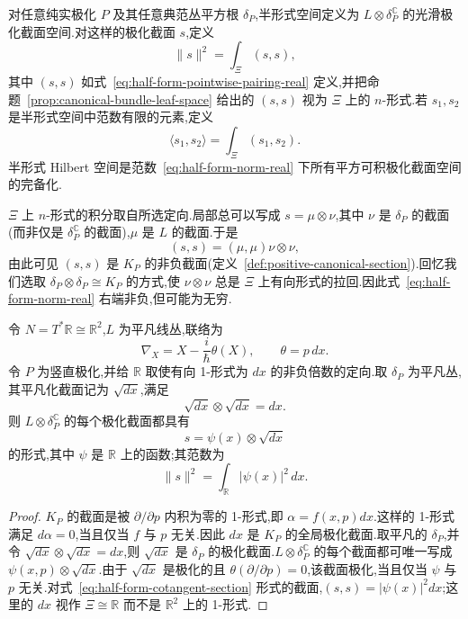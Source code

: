 \begin{definition}
\label{def:half-form-space-real}
对任意纯实极化 $P$ 及其任意典范丛平方根 $\delta_P$,半形式空间定义为 $L\otimes\delta_P^{\mathbb C}$ 的光滑极化截面空间.对这样的极化截面 $s$,定义
\[
 \|s\|^2=\int_\Xi(s,s),
 \label{eq:half-form-norm-real}
\]
其中 $(s,s)$ 如式~\eqref{eq:half-form-pointwise-pairing-real} 定义,并把命题~\ref{prop:canonical-bundle-leaf-space} 给出的 $(s,s)$ 视为 $\Xi$ 上的 $n$-形式.若 $s_1,s_2$ 是半形式空间中范数有限的元素,定义
\[
 \langle s_1,s_2\rangle=\int_\Xi(s_1,s_2).
\]
半形式 Hilbert 空间是范数~\eqref{eq:half-form-norm-real} 下所有平方可积极化截面空间的完备化.
\end{definition}

$\Xi$ 上 $n$-形式的积分取自所选定向.局部总可以写成 $s=\mu\otimes\nu$,其中 $\nu$ 是 $\delta_P$ 的截面(而非仅是 $\delta_P^{\mathbb C}$ 的截面),$\mu$ 是 $L$ 的截面.于是
\[
 (s,s)=(\mu,\mu)\nu\otimes\nu,
\]
由此可见 $(s,s)$ 是 $K_P$ 的非负截面(定义~\ref{def:positive-canonical-section}).回忆我们选取 $\delta_P\otimes\delta_P\cong K_P$ 的方式,使 $\nu\otimes\nu$ 总是 $\Xi$ 上有向形式的拉回.因此式~\eqref{eq:half-form-norm-real} 右端非负,但可能为无穷.

\begin{example}[余切直线的半形式空间]
\label{ex:half-form-cotangent-line}
令 $N=T^*\mathbb R\cong\mathbb R^2$,$L$ 为平凡线丛,联络为
\[
 \nabla_X=X-\frac{i}{\hbar}\theta(X),\qquad \theta=p\,dx.
\]
令 $P$ 为竖直极化,并给 $\mathbb R$ 取使有向 1-形式为 $dx$ 的非负倍数的定向.取 $\delta_P$ 为平凡丛,其平凡化截面记为 $\sqrt{dx}$,满足
\[
 \sqrt{dx}\otimes\sqrt{dx}=dx.
\]
则 $L\otimes\delta_P^{\mathbb C}$ 的每个极化截面都具有
\[
 s=\psi(x)\otimes\sqrt{dx}
 \label{eq:half-form-cotangent-section}
\]
的形式,其中 $\psi$ 是 $\mathbb R$ 上的函数;其范数为
\[
 \|s\|^2=\int_{\mathbb R}|\psi(x)|^2\,dx.
\]
\end{example}

\begin{proof}
$K_P$ 的截面是被 $\partial/\partial p$ 内积为零的 1-形式,即 $\alpha=f(x,p)dx$.这样的 1-形式满足 $d\alpha=0$,当且仅当 $f$ 与 $p$ 无关.因此 $dx$ 是 $K_P$ 的全局极化截面.取平凡的 $\delta_P$,并令 $\sqrt{dx}\otimes\sqrt{dx}=dx$,则 $\sqrt{dx}$ 是 $\delta_P$ 的极化截面.$L\otimes\delta_P^{\mathbb C}$ 的每个截面都可唯一写成 $\psi(x,p)\otimes\sqrt{dx}$.由于 $\sqrt{dx}$ 是极化的且 $\theta(\partial/\partial p)=0$,该截面极化,当且仅当 $\psi$ 与 $p$ 无关.对式~\eqref{eq:half-form-cotangent-section} 形式的截面,$(s,s)=|\psi(x)|^2dx$;这里的 $dx$ 视作 $\Xi\cong\mathbb R$ 而不是 $\mathbb R^2$ 上的 1-形式.
\end{proof}

